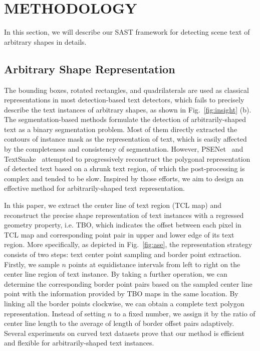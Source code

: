 \documentclass[sigconf]{acmart}
\begin{document}
\section{METHODOLOGY}
In this section, we will describe our SAST framework for detecting scene text of arbitrary shapes in details.

\subsection{Arbitrary Shape Representation}

The bounding boxes, rotated rectangles, and quadrilaterals are used as classical representations in most detection-based text detectors, which fails to precisely describe the text instances of arbitrary shapes, as shown in Fig.~\ref{fig:insight} (b). 
The segmentation-based methods formulate the detection of arbitrarily-shaped text as a binary segmentation problem. Most of them directly extracted the contours of instance mask as the representation of text, which is easily affected by the completeness and consistency of segmentation. However, PSENet~\cite{wang2019shape} and TextSnake~\cite{long2018textsnake} attempted to progressively reconstruct the polygonal representation of detected text based on a shrunk text region, of which the post-processing is complex and tended to be slow. Inspired by those efforts, we aim to design an effective method for arbitrarily-shaped text representation.
 


In this paper, we extract the center line of text region (TCL map) and reconstruct the precise shape representation of text instances with a regressed geometry property, i.e. TBO, which indicates the offset between each pixel in TCL map and corresponding point pair in upper and lower edge of its text region. More specifically, as depicted in Fig.~\ref{fig:ase}, the representation strategy consists of two steps: text center point sampling and border point extraction. Firstly, we sample $n$ points at equidistance intervals from left to right on the center line region of text instance. By taking a further operation, we can determine the corresponding border point pairs based on the sampled center line point with the information provided by TBO maps in the same location. By linking all the border points clockwise, we can obtain a complete text polygon representation. Instead of setting $n$ to a fixed number, we assign it by the ratio of center line length to the average of length of border offset pairs adaptively. Several experiments on curved text datasets prove that our method is efficient and flexible for arbitrarily-shaped text instances. 
\end{document}
